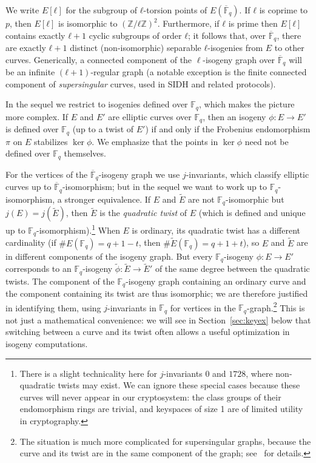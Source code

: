 \documentclass{llncs}
\newcommand{\F}{\mathbb{F}}
\newcommand{\Fbar}{\overline{\mathbb{F}}}
\begin{document}
We write $E[ℓ]$ for the subgroup of $ℓ$-torsion points of
$E(\Fbar_q)$.  If $ℓ$ is coprime to $p$, then $E[ℓ]$ is isomorphic to
$(ℤ/ℓℤ)^2$.  Furthermore, if $ℓ$ is prime then $E[ℓ]$ contains exactly
$ℓ+1$ cyclic subgroups of order $ℓ$; it follows that, over $\Fbar_q$,
there are exactly $ℓ+1$ distinct (non-isomorphic) separable $ℓ$-isogenies 
from $E$ to other curves.
Generically, a connected component of the $\ell$-isogeny graph 
over $\Fbar_q$ will be an infinite $(ℓ+1)$-regular
graph (a notable exception is the finite connected component of
\emph{supersingular} curves, used in SIDH and related protocols).

In the sequel we restrict to isogenies defined over $\F_q$, 
which makes the picture more complex.  
If $E$ and $E'$ are elliptic curves over $\F_q$,
then an isogeny $ϕ:E→E'$ is defined over $\F_q$
(up to a twist of $E'$)
if and only if the Frobenius endomorphism $\pi$ on $E$ stabilizes $\ker ϕ$.
We emphasize that the points in $\ker\phi$ need not
be defined over $\F_q$ themselves.

For the vertices of the $\Fbar_q$-isogeny graph
we use $j$-invariants,
which classify elliptic curves up to
$\Fbar_q$-isomorphism;
but in the sequel we want to work up to $\F_q$-isomorphism,
a stronger equivalence.
If $E$ and $\tilde{E}$ are not $\F_q$-isomorphic
but $j(E) = j(\tilde{E})$,
then $\tilde{E}$ is the \emph{quadratic twist} of $E$
(which is defined and unique up to $\F_q$-isomorphism).\footnote{
    There is a slight technicality here for $j$-invariants $0$ and $1728$,
    where non-quadratic twists may exist.
    We can ignore these special cases
    because these curves will never appear in our cryptosystem:
    the class groups of their endomorphism rings are trivial,
    and keyspaces of size 1 are of limited utility in cryptography.
}
When $E$ is ordinary,
its quadratic twist has a different cardinality
(if $\#E(\F_q) = q + 1 - t$, then $\#\tilde{E}(\F_q) = q + 1 + t$),
so $E$ and $\tilde{E}$ are in different components of the isogeny graph.
But every $\F_q$-isogeny $\phi: E \to E'$ 
corresponds to an $\F_q$-isogeny $\tilde{\phi}: \tilde{E} \to \tilde{E}'$
of the same degree between the quadratic twists.
The component of the $\F_q$-isogeny graph containing an ordinary curve 
and the component containing its twist are thus isomorphic;
we are therefore justified in identifying them,
using $j$-invariants in $\F_q$ for vertices in the $\F_q$-graph.\footnote{
    The situation is much more complicated for supersingular graphs,
    because the curve and its twist are in the same component
    of the graph; see~\cite[\S2]{DelfsG16} for details.
}
This is not just a mathematical convenience:
we will see in Section~\ref{sec:keyex} below 
that switching between a curve and its twist
often allows a useful optimization in isogeny computations.
\end{document}
